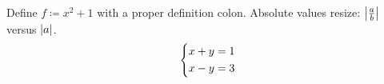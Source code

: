 \documentclass{article}
\DeclarePairedDelimiter{\abs}{\lvert}{\rvert}
\begin{document}
Define $f \coloneqq x^2 + 1$ with a proper definition colon.
Absolute values resize: $\abs*{\frac{a}{b}}$ versus $\abs{a}$.
\[
\begin{dcases}
x + y = 1 \\
x - y = 3
\end{dcases}
\]
\end{document}
